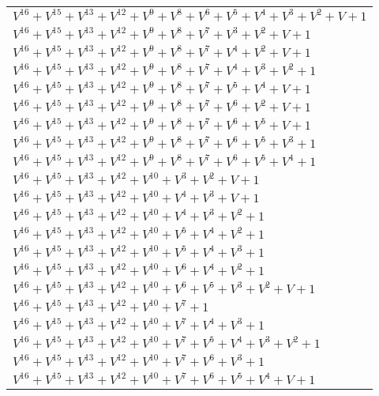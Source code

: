 \documentclass[12pt]{article}
\begin{document}
\begin{adjustwidth}{-4cm}{}
\begin{center}
\begin{longtable}{|l|}
$V^{16}  +V^{15}  +V^{13}  +V^{12}  +V^{9}  +V^{8}  +V^{6}  +V^{5}  +V^{4}  +V^{3}  +V^{2}  + V + 1$ \\
$V^{16}  +V^{15}  +V^{13}  +V^{12}  +V^{9}  +V^{8}  +V^{7}  +V^{3}  +V^{2}  + V + 1$ \\
$V^{16}  +V^{15}  +V^{13}  +V^{12}  +V^{9}  +V^{8}  +V^{7}  +V^{4}  +V^{2}  + V + 1$ \\
$V^{16}  +V^{15}  +V^{13}  +V^{12}  +V^{9}  +V^{8}  +V^{7}  +V^{4}  +V^{3}  +V^{2}  + 1$ \\
$V^{16}  +V^{15}  +V^{13}  +V^{12}  +V^{9}  +V^{8}  +V^{7}  +V^{5}  +V^{4}  + V + 1$ \\
$V^{16}  +V^{15}  +V^{13}  +V^{12}  +V^{9}  +V^{8}  +V^{7}  +V^{6}  +V^{2}  + V + 1$ \\
$V^{16}  +V^{15}  +V^{13}  +V^{12}  +V^{9}  +V^{8}  +V^{7}  +V^{6}  +V^{5}  + V + 1$ \\
$V^{16}  +V^{15}  +V^{13}  +V^{12}  +V^{9}  +V^{8}  +V^{7}  +V^{6}  +V^{5}  +V^{3}  + 1$ \\
$V^{16}  +V^{15}  +V^{13}  +V^{12}  +V^{9}  +V^{8}  +V^{7}  +V^{6}  +V^{5}  +V^{4}  + 1$ \\
$V^{16}  +V^{15}  +V^{13}  +V^{12}  +V^{10}  +V^{3}  +V^{2}  + V + 1$ \\
$V^{16}  +V^{15}  +V^{13}  +V^{12}  +V^{10}  +V^{4}  +V^{3}  + V + 1$ \\
$V^{16}  +V^{15}  +V^{13}  +V^{12}  +V^{10}  +V^{4}  +V^{3}  +V^{2}  + 1$ \\
$V^{16}  +V^{15}  +V^{13}  +V^{12}  +V^{10}  +V^{5}  +V^{4}  +V^{2}  + 1$ \\
$V^{16}  +V^{15}  +V^{13}  +V^{12}  +V^{10}  +V^{5}  +V^{4}  +V^{3}  + 1$ \\
$V^{16}  +V^{15}  +V^{13}  +V^{12}  +V^{10}  +V^{6}  +V^{4}  +V^{2}  + 1$ \\
$V^{16}  +V^{15}  +V^{13}  +V^{12}  +V^{10}  +V^{6}  +V^{5}  +V^{3}  +V^{2}  + V + 1$ \\
$V^{16}  +V^{15}  +V^{13}  +V^{12}  +V^{10}  +V^{7}  + 1$ \\
$V^{16}  +V^{15}  +V^{13}  +V^{12}  +V^{10}  +V^{7}  +V^{4}  +V^{3}  + 1$ \\
$V^{16}  +V^{15}  +V^{13}  +V^{12}  +V^{10}  +V^{7}  +V^{5}  +V^{4}  +V^{3}  +V^{2}  + 1$ \\
$V^{16}  +V^{15}  +V^{13}  +V^{12}  +V^{10}  +V^{7}  +V^{6}  +V^{3}  + 1$ \\
$V^{16}  +V^{15}  +V^{13}  +V^{12}  +V^{10}  +V^{7}  +V^{6}  +V^{5}  +V^{4}  + V + 1$ \\

\end{longtable}
\end{center}
\end{adjustwidth}
\end{document}
